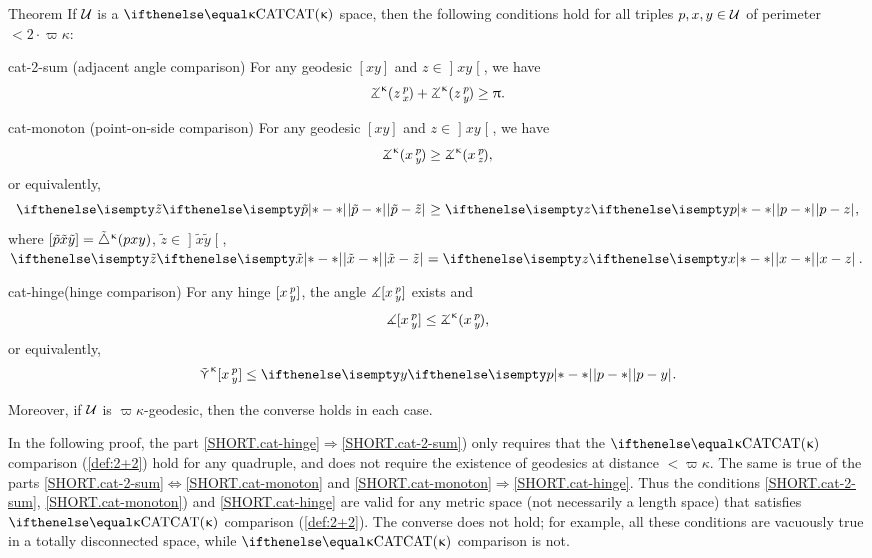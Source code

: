 \begin{thm}{Theorem}
\label{thm:defs_of_cat} 
If $\mathcal{U}$ is a $\CAT\kappa$ space, then 
the following conditions hold for all triples $p,x,y\in \spc{U}$ of perimeter $<2\cdot\varpi\kappa$:

\begin{subthm}{cat-2-sum} (adjacent angle comparison) For any geodesic $[x y]$ and $z\in \mathopen{]}x y\mathclose{[}$, we have
\[\angk\kappa z p x
+\angk\kappa z p y\ge \pi.\]
\end{subthm}

\begin{subthm}{cat-monoton}
(point-on-side comparison) 
For any geodesic $[x y]$ and $z\in \mathopen{]}x y\mathclose{[}$, we have
\[\angk\kappa x p y\ge\angk\kappa x p z,\]
or equivalently, 
\[\dist{\tilde p}{\tilde z}{}\ge \dist{p}{z}{},\]
where $[{\tilde p}{\tilde x}{\tilde y}]={\tilde\triangle}^{\upkappa}(p x y)$, $\tilde z\in\mathopen{]} \tilde x\tilde y\mathclose{[}$, $\dist{\tilde x}{\tilde z}{}=\dist{x}{z}{}$.
\end{subthm}

\begin{subthm}{cat-hinge}(hinge comparison)
For any hinge $[x\,{}^{p}_{y}]$, the angle 
$\measuredangle[x\,{}^{p}_{y}]$ exists and
\[\mangle\hinge x p y\le\angk\kappa x p y,\]
or equivalently,
\[\side\kappa \hinge x p y\le\dist{p}{y}{}.\]
\end{subthm}

Moreover, if  $\mathcal{U}$ is  $\varpi\kappa$-geodesic, then the converse holds in each case.  

\end{thm}


\label{22remark}
In the following proof, the part \ref{SHORT.cat-hinge}$\Rightarrow$\ref{SHORT.cat-2-sum})
only requires that the $\CAT\kappa$ comparison (\ref{def:2+2}) hold for any quadruple, and does not require the existence of geodesics at distance $<\varpi\kappa$. 
The same is true of the parts \ref{SHORT.cat-2-sum}$\Leftrightarrow$\ref{SHORT.cat-monoton} and
\ref{SHORT.cat-monoton}$\Rightarrow$\ref{SHORT.cat-hinge}.  
Thus the conditions \ref{SHORT.cat-2-sum}, \ref{SHORT.cat-monoton}) and \ref{SHORT.cat-hinge} are valid for any metric space (not necessarily a length space) that satisfies $\CAT\kappa$ comparison (\ref{def:2+2}). 
The converse does not hold; for example, all these conditions are 
vacuously true in a 
totally disconnected space, while 
$\CAT\kappa$ comparison is not.

